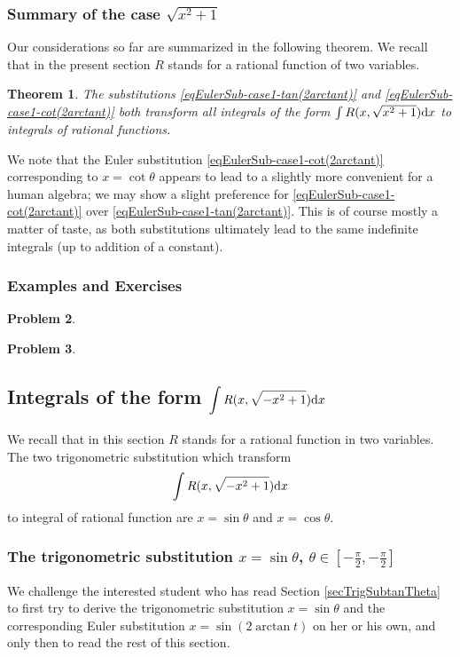 \documentclass[12pt]{book}
\newtheorem{theorem}{Theorem}[section]
\newtheorem{problem}[theorem]{Problem}
\begin{document}
\subsubsection{Summary of the case $\sqrt{x^2+1}$}
Our considerations so far are summarized in the following theorem. We recall that in the present section $R$ stands for a rational function of two variables. 
\begin{theorem}
The substitutions \eqref{eqEulerSub-case1-tan(2arctant)} and \eqref{eqEulerSub-case1-cot(2arctant)} both transform all integrals of the form $ \int R(x, \sqrt{ x^2+1}){\normalfont \text{d}} x$ to integrals of rational functions.
\end{theorem}
We note that the Euler substitution \eqref{eqEulerSub-case1-cot(2arctant)} corresponding to $x=\cot \theta$ appears to lead to a slightly more convenient for a human algebra; we may show a slight preference for \eqref{eqEulerSub-case1-cot(2arctant)}  over \eqref{eqEulerSub-case1-tan(2arctant)}. This is of course mostly a matter of taste, as both substitutions ultimately lead to the same indefinite integrals (up to addition of a constant).
\subsubsection{Examples and Exercises}

\begin{problem}

\end{problem}


\begin{problem}

\end{problem}


\subsection{Integrals of the form $\displaystyle \int R(x,\sqrt{-x^2+1}){\normalfont \text{d}} x$}
We recall that in this section $R$ stands for a rational function in two variables. The two trigonometric substitution which transform
\[
\int R(x, \sqrt{-x^2+1}){\normalfont \text{d}} x
\]
to integral of rational function are $x=\sin \theta$ and $x=\cos \theta$.

\subsubsection{The trigonometric substitution $x=\sin \theta$, $\theta \in \left[-\frac{\pi}{2},-\frac{\pi}{2} \right]$}
We challenge the interested student who has read Section \ref{secTrigSubtanTheta} to first try to derive the trigonometric substitution $x=\sin \theta$ and the corresponding Euler substitution $x=\sin (2 \arctan t)$  on her or his own, and only then to read the rest of this section.
\end{document}
